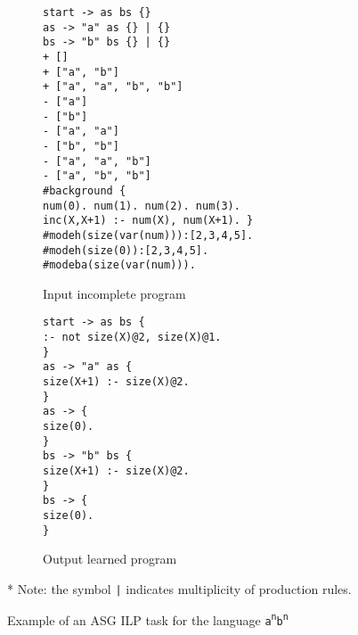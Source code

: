 \begin{figure}[H]
\centering
\begin{subfigure}{0.55\textwidth}
\texttt{start -> as bs \{\} \\
as -> "a" as \{\} | \{\} \\
bs -> "b" bs \{\} | \{\} \\
\newline
+ [] \\
+ ["a", "b"] \\
+ ["a", "a", "b", "b"] \\
- ["a"] \\
- ["b"] \\
- ["a", "a"] \\
- ["b", "b"] \\
- ["a", "a", "b"] \\
- ["a", "b", "b"] \\
\newline
\#background \{ \\
num(0). num(1). num(2). num(3). \\
inc(X,X+1) :- num(X), num(X+1). \} \\
\newline
\#modeh(size(var(num))):[2,3,4,5]. \\
\#modeh(size(0)):[2,3,4,5]. \\
\#modeba(size(var(num))). \\}
\caption{Input incomplete program}
\end{subfigure}
\begin{subfigure}{0.44\textwidth}
\texttt{start -> as bs \{ \\
\phantom{ }:- not size(X)@2, size(X)@1. \\
\} \\
\newline
as -> "a" as \{ \\
\phantom{ }size(X+1) :- size(X)@2. \\
\} \\
\newline
as -> \{ \\
\phantom{ }size(0). \\
\} \\
\newline
bs -> "b" bs \{ \\
\phantom{ }size(X+1) :- size(X)@2. \\
\} \\
\newline
bs -> \{ \\
\phantom{ }size(0). \\
\}} \\
\caption{Output learned program}
\end{subfigure}
\newline
\newline
* Note: the symbol \texttt{|} indicates multiplicity of production rules.
\caption{Example of an ASG ILP task for the language \texttt{a\textsuperscript{n}b\textsuperscript{n}}}
\label{fig:asg_ilp_example}
\end{figure}